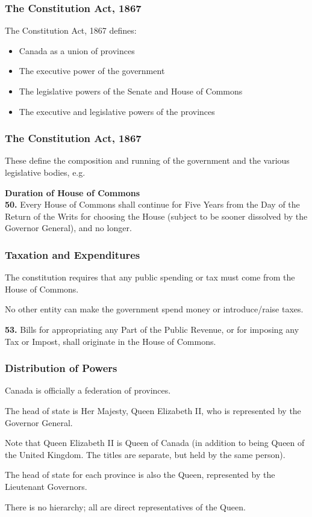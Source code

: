 \begin{frame}
\frametitle{The Constitution Act, 1867}

The Constitution Act, 1867 defines:

\begin{itemize}
\item Canada as a union of provinces
\item The executive power of the government
\item The legislative powers of the Senate and House of Commons
\item The executive and legislative powers of the provinces
\end{itemize}


\end{frame}



\begin{frame}
\frametitle{The Constitution Act, 1867}

These define the composition and running of the government and the various legislative bodies, e.g.

\textbf{Duration of House of Commons}\\
\quad \textbf{50.}	Every House of Commons shall continue for Five Years from 
	the Day of the Return of the Writs for choosing the House 
	(subject to be sooner dissolved by the Governor General), and 
	no longer.

\end{frame}



\begin{frame}
\frametitle{Taxation and Expenditures}
The constitution requires that any public spending or tax must come from the House of Commons.

No other entity can make the government spend money or introduce/raise taxes.

\quad \textbf{53.}	Bills for appropriating any Part of the Public
		Revenue, or for imposing any Tax or Impost, shall 
		originate in the House of Commons.

\end{frame}



\begin{frame}
\frametitle{Distribution of Powers}
Canada is officially a federation of provinces.

The head of state is Her Majesty, Queen Elizabeth II, who is represented by the Governor General.

Note that Queen Elizabeth II is Queen of Canada (in addition to being Queen of the United Kingdom. The titles are separate, but held by the same person).

The head of state for each province is also the Queen, represented by the Lieutenant Governors.

There is no hierarchy; all are direct representatives of the Queen.

\end{frame}



